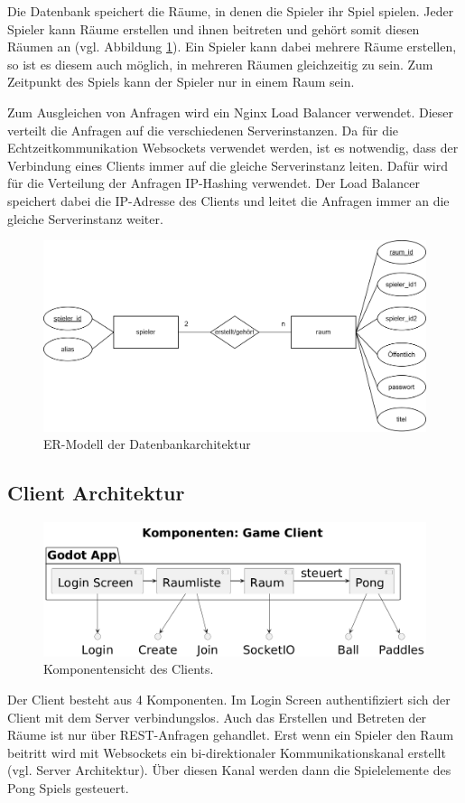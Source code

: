 \documentclass[
]{article}
\begin{document}
Die Datenbank speichert die Räume, in denen die Spieler ihr Spiel spielen. 
Jeder Spieler kann Räume erstellen und ihnen beitreten und gehört somit diesen 
Räumen an (vgl. Abbildung \ref{fig:ER-Modell}).
Ein Spieler kann dabei mehrere Räume erstellen, so ist es diesem auch möglich, in mehreren Räumen gleichzeitig zu sein.
Zum Zeitpunkt des Spiels kann der Spieler nur in einem Raum sein.

Zum Ausgleichen von Anfragen wird ein Nginx Load Balancer verwendet.
Dieser verteilt die Anfragen auf die verschiedenen Serverinstanzen.
Da für die Echtzeitkommunikation Websockets verwendet werden, ist es notwendig,
dass der Verbindung eines Clients immer auf die gleiche Serverinstanz leiten.
Dafür wird für die Verteilung der Anfragen IP-Hashing verwendet.
Der Load Balancer speichert dabei die IP-Adresse des Clients und 
leitet die Anfragen immer an die gleiche Serverinstanz weiter.

\begin{figure}[H]
	\centering
	\includegraphics[width=\textwidth ]{resources/ER-Modell.png}
	\caption{ER-Modell der Datenbankarchitektur}
	\label{fig:ER-Modell}
\end{figure}

\subsection{Client Architektur}
\begin{figure}[H]
	\centering
	\includegraphics[width=\textwidth -80pt ]{resources/Client-Architektur.png}
	\caption{Komponentensicht des Clients.}
	\label{fig:clientarchitektur}
\end{figure}
Der Client besteht aus 4 Komponenten. Im Login Screen authentifiziert sich der Client mit dem Server verbindungslos. Auch das Erstellen und Betreten der Räume ist nur über REST-Anfragen gehandlet. Erst wenn ein Spieler den Raum beitritt wird mit Websockets ein bi-direktionaler Kommunikationskanal erstellt (vgl. Server Architektur). Über diesen Kanal werden dann die Spielelemente des Pong Spiels gesteuert. 
\end{document}
